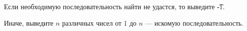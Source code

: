 Если необходимую последовательность найти не удастся, то выведите \t{-1}.

Иначе, выведите $n$ различных чисел от 1 до $n$ --- искомую последовательность.